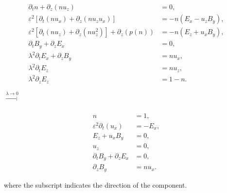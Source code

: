 \documentclass{article}
\begin{document}
\vspace{-0.3cm}
\begin{minipage}{0.6\textwidth}
    \begin{align*}
        \partial_t n + \partial_z(nu_z) &= 0, \\
        \varepsilon^2[\partial_t(nu_x) + \partial_z(nu_zu_x)] &= - n(E_x - u_zB_y), \\
        \varepsilon^2[\partial_t(nu_z) + \partial_z(nu_z^2)] + \partial_z(p(n)) &= -n(E_z + u_xB_y), \\
        \partial_t B_y + \partial_z E_x &= 0, \\
        \lambda^2 \partial_t E_x + \partial_z B_y &= nu_x, \\
        \lambda^2 \partial_t E_z &= nu_z, \\
        \lambda^2 \partial_z E_z &= 1 - n.
    \end{align*}
\end{minipage}
$\xrightarrow[]{\lambda \rightarrow 0}$
\begin{minipage}{0.3\textwidth}
    \begin{align*}
        n &= 1,\\
        \varepsilon^2 \partial_t(u_x) &= - E_x, \\
        E_z + u_xB_y &= 0, \\
        u_z &= 0, \\
        \partial_t B_y + \partial_z E_x &= 0, \\
        \partial_z B_y &= nu_x.
    \end{align*}
\end{minipage}
where the subscript indicates the direction of the component.
\end{document}

